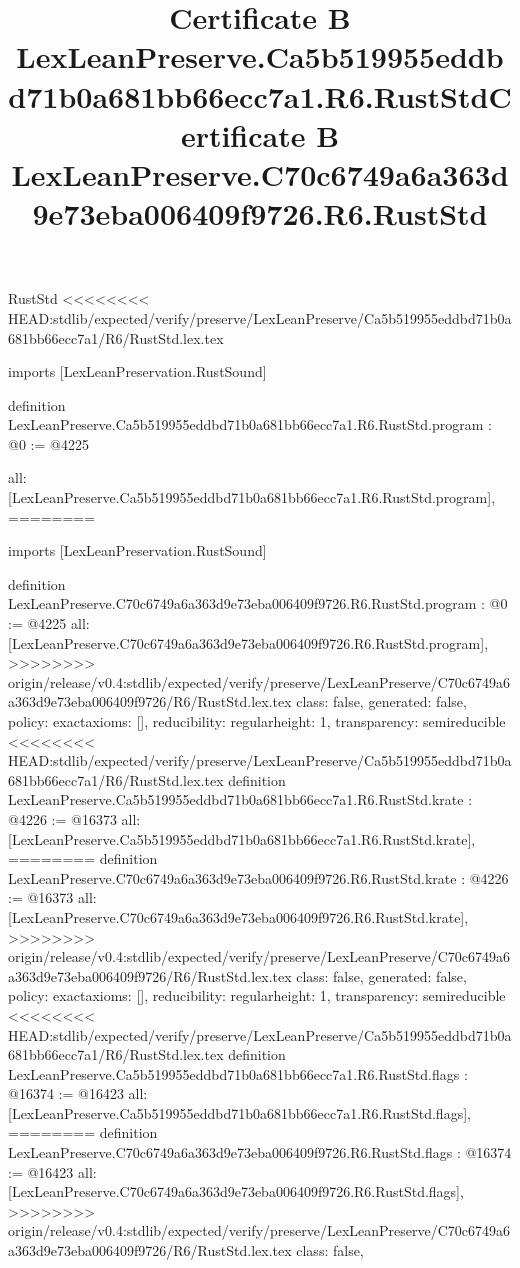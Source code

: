 \begin{lexlean}{RustStd}
<<<<<<<< HEAD:stdlib/expected/verify/preserve/LexLeanPreserve/Ca5b519955eddbd71b0a681bb66ecc7a1/R6/RustStd.lex.tex
\title{Certificate B LexLeanPreserve.Ca5b519955eddbd71b0a681bb66ecc7a1.R6.RustStd}
\begin{coremodule}
imports [LexLeanPreservation.RustSound]

definition LexLeanPreserve.Ca5b519955eddbd71b0a681bb66ecc7a1.R6.RustStd.program : @0 := @4225 {
  all: [LexLeanPreserve.Ca5b519955eddbd71b0a681bb66ecc7a1.R6.RustStd.program],
========
\title{Certificate B LexLeanPreserve.C70c6749a6a363d9e73eba006409f9726.R6.RustStd}
\begin{coremodule}
imports [LexLeanPreservation.RustSound]

definition LexLeanPreserve.C70c6749a6a363d9e73eba006409f9726.R6.RustStd.program : @0 := @4225 {
  all: [LexLeanPreserve.C70c6749a6a363d9e73eba006409f9726.R6.RustStd.program],
>>>>>>>> origin/release/v0.4:stdlib/expected/verify/preserve/LexLeanPreserve/C70c6749a6a363d9e73eba006409f9726/R6/RustStd.lex.tex
  class: false,
  generated: false,
  policy: exact{axioms: []},
  reducibility: regular{height: 1},
  transparency: semireducible
}
<<<<<<<< HEAD:stdlib/expected/verify/preserve/LexLeanPreserve/Ca5b519955eddbd71b0a681bb66ecc7a1/R6/RustStd.lex.tex
definition LexLeanPreserve.Ca5b519955eddbd71b0a681bb66ecc7a1.R6.RustStd.krate : @4226 := @16373 {
  all: [LexLeanPreserve.Ca5b519955eddbd71b0a681bb66ecc7a1.R6.RustStd.krate],
========
definition LexLeanPreserve.C70c6749a6a363d9e73eba006409f9726.R6.RustStd.krate : @4226 := @16373 {
  all: [LexLeanPreserve.C70c6749a6a363d9e73eba006409f9726.R6.RustStd.krate],
>>>>>>>> origin/release/v0.4:stdlib/expected/verify/preserve/LexLeanPreserve/C70c6749a6a363d9e73eba006409f9726/R6/RustStd.lex.tex
  class: false,
  generated: false,
  policy: exact{axioms: []},
  reducibility: regular{height: 1},
  transparency: semireducible
}
<<<<<<<< HEAD:stdlib/expected/verify/preserve/LexLeanPreserve/Ca5b519955eddbd71b0a681bb66ecc7a1/R6/RustStd.lex.tex
definition LexLeanPreserve.Ca5b519955eddbd71b0a681bb66ecc7a1.R6.RustStd.flags : @16374 := @16423 {
  all: [LexLeanPreserve.Ca5b519955eddbd71b0a681bb66ecc7a1.R6.RustStd.flags],
========
definition LexLeanPreserve.C70c6749a6a363d9e73eba006409f9726.R6.RustStd.flags : @16374 := @16423 {
  all: [LexLeanPreserve.C70c6749a6a363d9e73eba006409f9726.R6.RustStd.flags],
>>>>>>>> origin/release/v0.4:stdlib/expected/verify/preserve/LexLeanPreserve/C70c6749a6a363d9e73eba006409f9726/R6/RustStd.lex.tex
  class: false,
}}}
\end{coremodule}}
\end{coremodule}
\end{lexlean}
